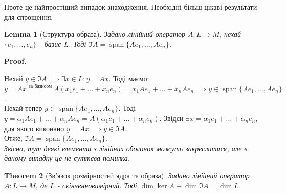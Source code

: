 \documentclass[a4paper, 10pt]{article}
\makeatletter
\theoremstyle{theoremdd}
\newtheorem{theorem}{Theorem}[subsection]
\newtheorem{lemma}[theorem]{Lemma}
\DeclareMathOperator{\linspan}{span}
\renewenvironment{proof}[1][Proof.\\]{\par
\pushQED{\hfill \qed}%
\normalfont \topsep6\p@\@plus6\p@\relax
\trivlist
\item\relax
{\bfseries
#1\@addpunct{.}}\hspace\labelsep\ignorespaces
}{%
\popQED\endtrivlist\@endpefalse
}
\makeatother
\begin{document}
\noindent
	Проте це найпростіший випадок знаходження. Необхідні більш цікаві результати для спрощення.
	\begin{lemma}[Структура образа]
	Задано лінійний оператор $A \colon L \to M$, нехай $\{e_1,\dots, e_n\}$ - базис $L$. Тоді $\Im A = \linspan \{Ae_1,\dots, Ae_n\}$.
	\end{lemma}
	
	\begin{proof}
	Нехай $y \in \Im A \implies \exists x \in L: y = Ax$. Тоді маємо:\\
	$y = Ax \overset{\textrm{за базисом}}{=} A(x_1e_1 + \dots + x_n e_n) = x_1 Ae_1 + \dots + x_n A e_n \implies y \in \linspan\{Ae_1,\dots,Ae_n\}$.\\
	Нехай тепер $y \in \linspan\{Ae_1,\dots,Ae_n\}$. Тоді $y = \alpha_1 Ae_1 + \dots + \alpha_n Ae_n = A(\alpha_1 e_1 + \dots + \alpha_n e_n)$. Звідси $\exists x = \alpha_1 e_1 + \dots + \alpha_n e_n$, для якого виконано $y = Ax \implies y \in \Im A$.\\
	Отже, $\Im A = \linspan \{Ae_1, \dots, Ae_n \}$.\\
	\textit{Звісно, тут деякі елементи з лінійних оболонок можуть закреслитися, але в даному випадку це не суттєва помилка.}
	\end{proof}
	
	\begin{theorem}[Зв'язок розмірностей ядра та образа]
	Задано лінійний оператор $A \colon L \to M$, де $L$ - скінченновимірний. Тоді $\dim \ker A + \dim \Im A = \dim L$.
	\end{theorem}
	
\end{document}
